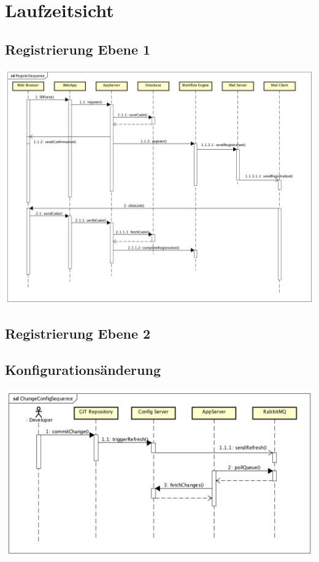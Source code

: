 \graphicspath{{./images/}}

\chapter{Laufzeitsicht}


\section{Registrierung Ebene 1}

\begin{center}
	\includegraphics[scale=0.47]{RegisterSequence.png}
\end{center}

\section{Registrierung Ebene 2}

\section{Konfigurationsänderung}
\begin{center}
	\includegraphics[scale=0.47]{ChangeConfigSequence.png}
\end{center}

